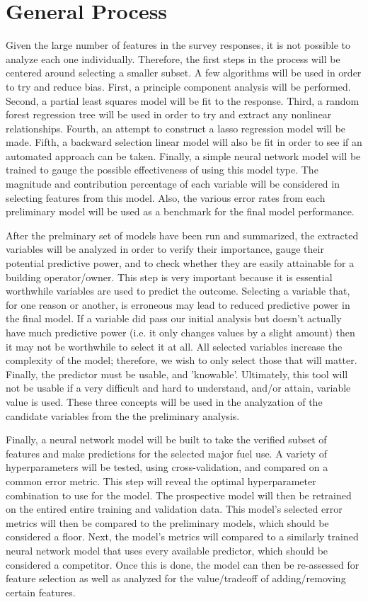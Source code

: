 {\section*{General Process}}

Given the large number of features in the survey responses, it is not possible to analyze each one individually.  Therefore, the first steps in the process will be centered around selecting a smaller subset.  A few algorithms will be used in order to try and reduce bias.  First, a principle component analysis will be performed.  Second, a partial least squares model will be fit to the response.  Third, a random forest regression tree will be used in order to try and extract any nonlinear relationships.  Fourth, an attempt to construct a lasso regression model will be made.  Fifth, a backward selection linear model will also be fit in order to see if an automated approach can be taken.  Finally, a simple neural network model will be trained to gauge the possible effectiveness of using this model type.  The magnitude and contribution percentage of each variable will be considered in selecting features from this model.  Also, the various error rates from each preliminary model will be used as a benchmark for the final model performance.

After the prelminary set of models have been run and summarized, the extracted variables will be analyzed in order to verify their importance, gauge their potential predictive power, and to check whether they are easily attainable for a building operator/owner.  This step is very important because it is essential worthwhile variables are used to predict the outcome.  Selecting a variable that, for one reason or another, is erroneous may lead to reduced predictive power in the final model.  If a variable did pass our initial analysis but doesn't actually have much predictive power (i.e. it only changes values by a slight amount) then it may not be worthwhile to select it at all.  All selected variables increase the complexity of the model; therefore, we wish to only select those that will matter.  Finally, the predictor must be usable, and 'knowable'.  Ultimately, this tool will not be usable if a very difficult and hard to understand, and/or attain, variable value is used.  These three concepts will be used in the analyzation of the candidate variables from the the preliminary analysis. 

Finally, a neural network model will be built to take the verified subset of features and make predictions for the selected major fuel use.  A variety of hyperparameters will be tested, using cross-validation, and compared on a common error metric.  This step will reveal the optimal hyperparameter combination to use for the model.  The prospective model will then be retrained on the entired entire training and validation data.  This model's selected error metrics will then be compared to the preliminary models, which should be considered a floor.  Next, the model's metrics will compared to a similarly trained neural network model that uses every available predictor, which should be considered a competitor.  Once this is done, the model can then be re-assessed for feature selection as well as analyzed for the value/tradeoff of adding/removing certain features.